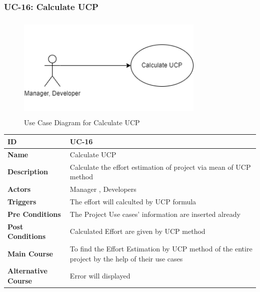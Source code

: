     \subsubsection{UC-16: Calculate UCP}
    \begin{figure}[H]
        \includegraphics[height=5cm, width=0.8\textwidth]{./diagrams/Use Case/u16.png}
        \centering 
        \caption{Use Case Diagram for Calculate UCP}
        \label{fig:Usecase1}
        \end{figure}
        
    \begin{center}
        \begin{tabularx}{\textwidth}{|l|X|}
            \hline
            \textbf{ID} & UC-16 \\
            \hline
            \textbf{Name} & Calculate UCP \\
            \hline
            \textbf{Description} & Calculate the effort estimation of project via mean of UCP method \\
            \hline
            \textbf{Actors} & Manager , Developers \\
            \hline
            \textbf{Triggers} & The effort will calculted by UCP formula \\
            \hline
            \textbf{Pre Conditions} & The Project Use cases' information are inserted already \\
            \hline
            \textbf{Post Conditions} & Calculated Effort are given by UCP method  \\
            \hline
            \textbf{Main Course} & To find the Effort Estimation by UCP method of the entire project by the help of their use cases \\
            \hline
            \textbf{Alternative Course} & Error will displayed \\
            \hline
            
        \end{tabularx}
    \end{center}
    
